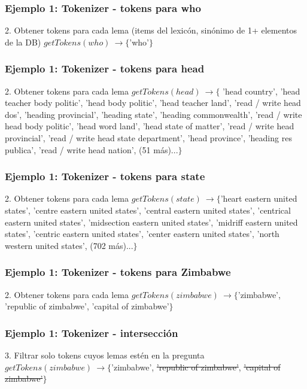 \begin{frame}[t]
\frametitle{Ejemplo 1: Tokenizer - tokens para who}
2. Obtener tokens para cada lema \tiny{(items del lexicón, sinónimo de 1+ elementos de la DB)} \newline
    \Large{$getTokens(who)\ \rightarrow \{$'who'$\}$}
\end{frame}

\begin{frame}[t]
\frametitle{Ejemplo 1: Tokenizer - tokens para head}
2. Obtener tokens para cada lema \newline
    \Large{$
    getTokens(head)\ \rightarrow \{$ 'head country', 'head teacher body politic', 'head body politic', 'head teacher land', 'read / write head dos', 'heading provincial', 'heading state', 'heading commonwealth', 'read / write head body politic', 'head word land', 'head state of matter', 'read / write head provincial', 'read / write head state department', 'head province',  'heading res publica', 'read / write head nation', (51 más)...$\}$}
\end{frame}

\begin{frame}[t]
\frametitle{Ejemplo 1: Tokenizer - tokens para state}
2. Obtener tokens para cada lema \newline
  \Large{ $getTokens(state)\ \rightarrow  \{$'heart eastern united states', 'centre eastern united states', 'central eastern united states', 'centrical eastern united states', 'midsection eastern united states', 'midriff eastern united states', 'centric eastern united states', 'center eastern united states', 'north western united states', (702 más)...$\}$}
\end{frame}

\begin{frame}[t]
\frametitle{Ejemplo 1: Tokenizer - tokens para Zimbabwe}
2. Obtener tokens para cada lema \newline
  \Large{$getTokens(zimbabwe)\ \rightarrow \{$'zimbabwe', 'republic of zimbabwe', 'capital of zimbabwe'$\}$}

\end{frame}

\begin{frame}[t]
\frametitle{Ejemplo 1: Tokenizer - intersección}
3. Filtrar solo tokens cuyos lemas estén en la pregunta\newline
  \Large{$getTokens(zimbabwe)\ \rightarrow \{$'zimbabwe', {\color{red}\st{'republic of zimbabwe'}}, {\color{red}\st{'capital of zimbabwe'}}$\}$ }
\end{frame}


